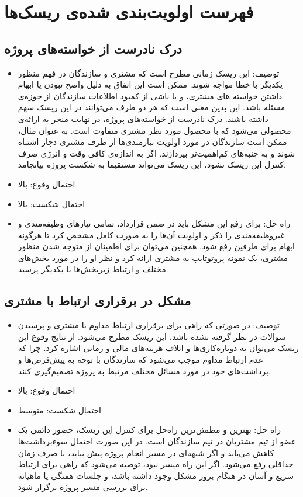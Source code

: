 \newpage
\section{فهرست اولویت‌بندی شده‌ی ریسک‌ها}

\subsection{درک نادرست از خواسته‌های پروژه}
\begin{itemize}
\item توصیف: این ریسک زمانی مطرح است که مشتری و سازندگان در فهم منظور یکدیگر با خطا مواجه شوند. ممکن است این اتفاق به دلیل واضح نبودن یا ابهام داشتن خواسته های مشتری، و یا ناشی از کمبود اطلاعات سازندگان از حوزه‌ی مسئله باشد. این بدین معنی است که هر دو طرف می‌توانند در این ریسک سهم داشته باشند. درک نادرست از خواسته‌های پروژه، در نهایت منجر به ارائه‌ی محصولی می‌شود که با محصول مورد نظر مشتری متفاوت است. به عنوان مثال، ممکن است سازندگان در مورد اولویت نیازمندی‌ها از طرف مشتری دچار اشتباه شوند و به جنبه‌های کم‌اهمیت‌تر بپردازند. اگر به اندازه‌ی کافی وقت و انرژی صرف کنترل این ریسک نشود، این ریسک می‌تواند مستقیما به شکست پروژه بیانجامد.
\item احتمال وقوع: بالا
\item احتمال شکست: بالا
\item راه حل: برای رفع این مشکل باید در ضمن قرارداد، تمامی نیازهای وظیفه‌مندی و غیروظیفه‌مندی را ذکر و اولویت آن‌ها را به صورت کامل مشخص کرد تا هرگونه ابهام برای طرفین رفع شود. همچنین می‌توان برای اطمینان از متوجه شدن منظور مشتری، یک نمونه پروتوتایپ به مشتری ارائه کرد و نظر او را در مورد بخش‌های مختلف و ارتباط زیربخش‌ها با یکدیگر پرسید.
\end{itemize}

\subsection{مشکل در برقراری ارتباط با مشتری}
\begin{itemize}
\item توصیف: در صورتی که راهی برای برقراری ارتباط مداوم با مشتری و پرسیدن سوالات در نظر گرفته نشده باشد، این ریسک مطرح می‌شود. از نتایج وقوع این ریسک می‌توان به دوباره‌کاری‌ها و اتلاف هزینه‌های مالی و زمانی اشاره کرد. چرا که عدم ارتباط مداوم موجب می‌شود که سازندگان با توجه به پیش‌فرض‌ها و برداشت‌های خود در مورد مسائل مختلف مرتبط به پروژه تصمیم‌گیری کنند.
\item احتمال وقوع: بالا
\item احتمال شکست: متوسط
\item راه حل: بهترین و مطمئن‌ترین راه‌حل برای کنترل این ریسک، حضور دائمی یک عضو از تیم مشتریان در تیم سازندگان است. در این صورت احتمال سوءبرداشت‌ها کاهش می‌یابد و اگر شبهه‌ای در مسیر انجام پروژه پیش بیاید، با صرف زمان حداقلی رفع می‌شود. اگر این راه میسر نبود، توصیه می‌شود که راهی برای ارتباط سریع و آسان در هنگام بروز مشکل وجود داشته باشد، و جلسات هفتگی یا ماهیانه برای بررسی مسیر پروژه برگزار شود.
\end{itemize}


